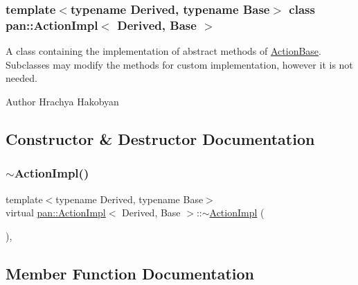 \subsubsection*{template$<$typename Derived, typename Base$>$\newline
class pan\+::\+Action\+Impl$<$ Derived, Base $>$}

A class containing the implementation of abstract methods of \hyperlink{classpan_1_1_action_base}{Action\+Base}. Subclasses may modify the methods for custom implementation, however it is not needed. 

\begin{DoxyAuthor}{Author}
Hrachya Hakobyan 
\end{DoxyAuthor}


\subsection{Constructor \& Destructor Documentation}
\mbox{\label{classpan_1_1_action_impl_a331fd4215f8a98e88ab05b9e361ce830}} 
\subsubsection{\texorpdfstring{$\sim$\+Action\+Impl()}{~ActionImpl()}}
{\footnotesize\ttfamily template$<$typename Derived, typename Base$>$ \\
virtual \hyperlink{classpan_1_1_action_impl}{pan\+::\+Action\+Impl}$<$ Derived, Base $>$\+::$\sim$\hyperlink{classpan_1_1_action_impl}{Action\+Impl} (\begin{DoxyParamCaption}{ }\end{DoxyParamCaption})\hspace{0.3cm}{\ttfamily [inline]}, {\ttfamily [virtual]}}



\subsection{Member Function Documentation}
\mbox{\label{classpan_1_1_action_impl_af94569c5a40d1de5c161282000c1a4c7}} 
